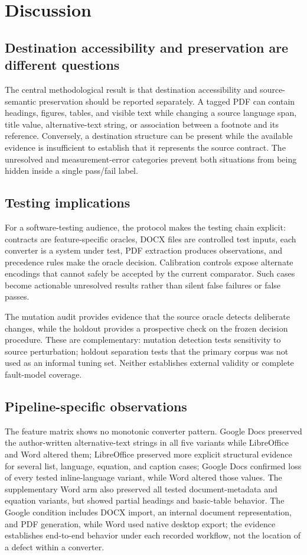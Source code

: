 \section{Discussion}
\label{sec:discussion}

\subsection{Destination accessibility and preservation are different questions}
The central methodological result is that destination accessibility and source-semantic preservation should be reported separately. A tagged PDF can contain headings, figures, tables, and visible text while changing a source language span, title value, alternative-text string, or association between a footnote and its reference. Conversely, a destination structure can be present while the available evidence is insufficient to establish that it represents the source contract. The unresolved and measurement-error categories prevent both situations from being hidden inside a single pass/fail label.

\subsection{Testing implications}
For a software-testing audience, the protocol makes the testing chain explicit: contracts are feature-specific oracles, DOCX files are controlled test inputs, each converter is a system under test, PDF extraction produces observations, and precedence rules make the oracle decision. Calibration controls expose alternate encodings that cannot safely be accepted by the current comparator. Such cases become actionable unresolved results rather than silent false failures or false passes.

The mutation audit provides evidence that the source oracle detects deliberate changes, while the holdout provides a prospective check on the frozen decision procedure. These are complementary: mutation detection tests sensitivity to source perturbation; holdout separation tests that the primary corpus was not used as an informal tuning set. Neither establishes external validity or complete fault-model coverage.

\subsection{Pipeline-specific observations}
The feature matrix shows no monotonic converter pattern. Google Docs preserved the author-written alternative-text strings in all five variants while LibreOffice and Word altered them; LibreOffice preserved more explicit structural evidence for several list, language, equation, and caption cases; Google Docs confirmed loss of every tested inline-language variant, while Word altered those values. The supplementary Word arm also preserved all tested document-metadata and equation variants, but showed partial headings and basic-table behavior. The Google condition includes DOCX import, an internal document representation, and PDF generation, while Word used native desktop export; the evidence establishes end-to-end behavior under each recorded workflow, not the location of a defect within a converter.

